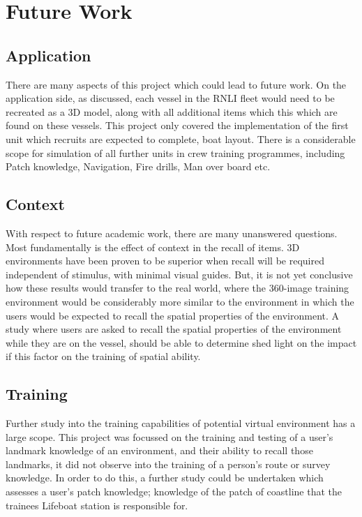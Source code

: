 \documentclass[a4paper, openright, twoside]{report}
\begin{document}
\section{Future Work}\label{further}
\subsection{Application}
There are many aspects of this project which could lead to future work. On the application side, as discussed, each vessel in the RNLI fleet would need to be recreated as a 3D model, along with all additional items which this which are found on these vessels. This project only covered the implementation of the first unit which recruits are expected to complete, boat layout. There is a considerable scope for simulation of all further units in crew training programmes, including Patch knowledge, Navigation, Fire drills, Man over board etc. 

\subsection{Context}
With respect to future academic work, there are many unanswered questions. Most fundamentally is the effect of context in the recall of items. 3D environments have been proven to be superior when recall will be required independent of stimulus, with minimal visual guides. But, it is not yet conclusive how these results would transfer to the real world, where the 360-image training environment would be considerably more similar to the environment in which the users would be expected to recall the spatial properties of the environment. A study where users are asked to recall the spatial properties of the environment while they are on the vessel, should be able to determine shed light on the impact if this factor on the training of spatial ability. 

\subsection{Training}
Further study into the training capabilities of potential virtual environment has a large scope. This project was focussed on the training and testing of a user's landmark knowledge of an environment, and their ability to recall those landmarks, it did not observe into the training of a person's route or survey knowledge. In order to do this, a further study could be undertaken which assesses a user's patch knowledge; knowledge of the patch of coastline that the trainees Lifeboat station is responsible for.
\end{document}

